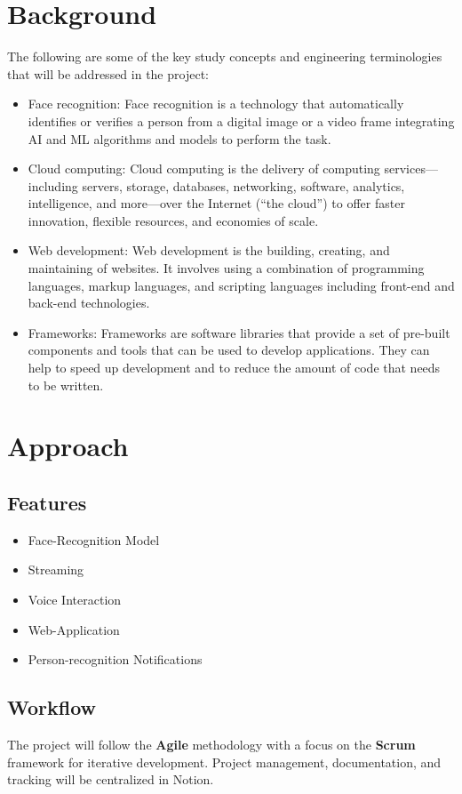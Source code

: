 \documentclass[a4 paper, 12pt]{article}
\begin{document}
\section{Background}
The following are some of the key study concepts and engineering terminologies that will be addressed in the project:

\begin{itemize}
    \item Face recognition: Face recognition is a technology that automatically identifies or verifies a person from a digital image or a video frame integrating AI and ML algorithms and models to perform the task.
    \item Cloud computing: Cloud computing is the delivery of computing services—including servers, storage, databases, networking, software, analytics, intelligence, and more—over the Internet (“the cloud”) to offer faster innovation, flexible resources, and economies of scale.
    \item Web development: Web development is the building, creating, and maintaining of websites. It involves using a combination of programming languages, markup languages, and scripting languages including front-end and back-end technologies.
    \item Frameworks: Frameworks are software libraries that provide a set of pre-built components and tools that can be used to develop applications. They can help to speed up development and to reduce the amount of code that needs to be written.
\end{itemize}

\section{Approach}
\subsection{Features}
\begin{itemize}
    \item Face-Recognition Model
    \item Streaming
    \item Voice Interaction
    \item Web-Application
    \item Person-recognition Notifications
\end{itemize}
\subsection{Workflow}
The project will follow the \textbf{Agile} methodology with a focus on the \textbf{Scrum} framework for iterative development. Project management, documentation, and tracking will be centralized in Notion.
\end{document}
